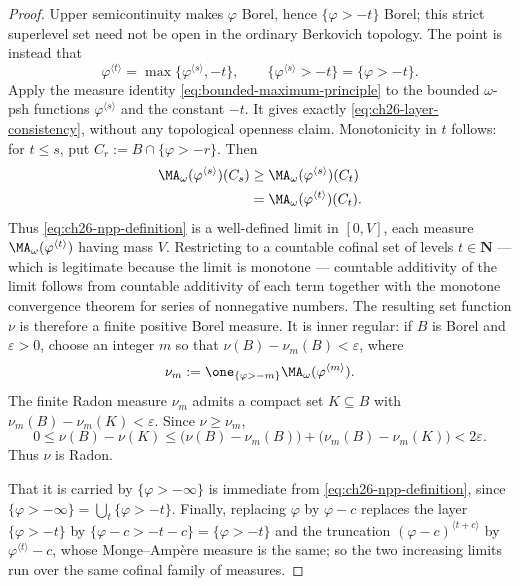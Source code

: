 \begin{proof}
Upper semicontinuity makes $\varphi$ Borel, hence
$\{\varphi>-t\}$ Borel; this strict superlevel set need not be open in
the ordinary Berkovich topology.  The point is instead that
\[
 \varphi^{\langle t\rangle}
   =\max\{\varphi^{\langle s\rangle},-t\},
 \qquad
 \{\varphi^{\langle s\rangle}>-t\}=\{\varphi>-t\}.
\]
Apply the measure identity \eqref{eq:bounded-maximum-principle} to the
bounded $\omega$-psh functions $\varphi^{\langle s\rangle}$ and the
constant $-t$.  It gives exactly
\eqref{eq:ch26-layer-consistency}, without any topological openness claim.
Monotonicity in $t$ follows: for
$t\leq s$, put $C_r:=B\cap\{\varphi>-r\}$.  Then
\[
 \begin{aligned}
 \MA_\omega(\varphi^{\langle s\rangle})(C_s)
 &\geq\MA_\omega(\varphi^{\langle s\rangle})(C_t)\\
 &=\MA_\omega(\varphi^{\langle t\rangle})(C_t).
 \end{aligned}
\]
Thus \eqref{eq:ch26-npp-definition} is a well-defined limit in
$[0,V]$, each measure $\MA_\omega(\varphi^{\langle t\rangle})$ having
mass $V$.  Restricting to a countable cofinal set of levels
$t\in\mathbf N$ --- which is legitimate because the limit is monotone ---
countable additivity of the limit follows from countable additivity of each
term together with the monotone convergence theorem for series of
nonnegative numbers.  The resulting set function $\nu$ is therefore a
finite positive Borel measure.  It is inner regular: if $B$ is Borel and
$\varepsilon>0$, choose an integer $m$ so that
$\nu(B)-\nu_m(B)<\varepsilon$, where
\[
 \nu_m:=\one_{\{\varphi>-m\}}
          \MA_\omega(\varphi^{\langle m\rangle}).
\]
The finite Radon measure $\nu_m$ admits a compact set $K\subseteq B$
with $\nu_m(B)-\nu_m(K)<\varepsilon$.  Since $\nu\geq\nu_m$,
\[
 0\leq\nu(B)-\nu(K)
 \leq\bigl(\nu(B)-\nu_m(B)\bigr)
      +\bigl(\nu_m(B)-\nu_m(K)\bigr)<2\varepsilon.
\]
Thus $\nu$ is Radon.

That it is carried by $\{\varphi>-\infty\}$ is immediate from
\eqref{eq:ch26-npp-definition}, since
$\{\varphi>-\infty\}=\bigcup_{t}\{\varphi>-t\}$.  Finally, replacing
$\varphi$ by $\varphi-c$ replaces the layer $\{\varphi>-t\}$ by
$\{\varphi-c>-t-c\}=\{\varphi>-t\}$ and the truncation
$(\varphi-c)^{\langle t+c\rangle}$ by
$\varphi^{\langle t\rangle}-c$, whose Monge--Amp\`ere measure is the same;
so the two increasing limits run over the same cofinal family of measures.
\end{proof}

